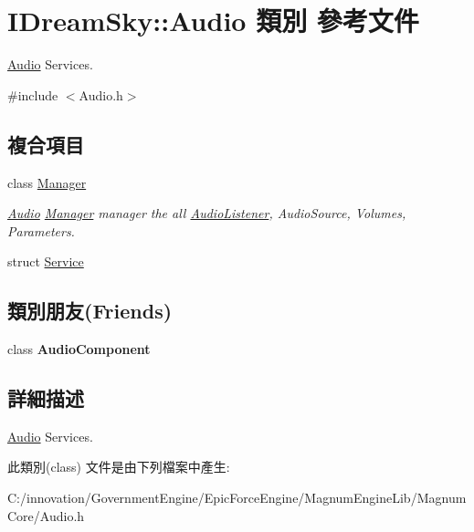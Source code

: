 \hypertarget{class_i_dream_sky_1_1_audio}{}\section{I\+Dream\+Sky\+:\+:Audio 類別 參考文件}
\label{class_i_dream_sky_1_1_audio}


\hyperlink{class_i_dream_sky_1_1_audio}{Audio} Services.  




{\ttfamily \#include $<$Audio.\+h$>$}

\subsection*{複合項目}
\begin{DoxyCompactItemize}
\item 
class \hyperlink{class_i_dream_sky_1_1_audio_1_1_manager}{Manager}
\begin{DoxyCompactList}\small\item\em \hyperlink{class_i_dream_sky_1_1_audio}{Audio} \hyperlink{class_i_dream_sky_1_1_audio_1_1_manager}{Manager} manager the all \hyperlink{class_i_dream_sky_1_1_audio_listener}{Audio\+Listener}, Audio\+Source, Volumes, Parameters. \end{DoxyCompactList}\item 
struct \hyperlink{struct_i_dream_sky_1_1_audio_1_1_service}{Service}
\end{DoxyCompactItemize}
\subsection*{類別朋友(Friends)}
\begin{DoxyCompactItemize}
\item 
class {\bfseries Audio\+Component}\hypertarget{class_i_dream_sky_1_1_audio_af76924648e1e664d148d0e3951b5a9ce}{}\label{class_i_dream_sky_1_1_audio_af76924648e1e664d148d0e3951b5a9ce}

\end{DoxyCompactItemize}


\subsection{詳細描述}
\hyperlink{class_i_dream_sky_1_1_audio}{Audio} Services. 

此類別(class) 文件是由下列檔案中產生\+:\begin{DoxyCompactItemize}
\item 
C\+:/innovation/\+Government\+Engine/\+Epic\+Force\+Engine/\+Magnum\+Engine\+Lib/\+Magnum\+Core/Audio.\+h\end{DoxyCompactItemize}
